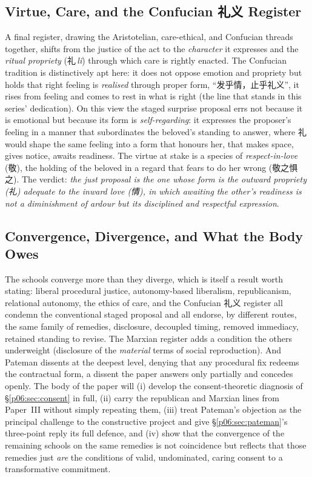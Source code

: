 \subsection{Virtue, Care, and the Confucian \texorpdfstring{\cjkfont 礼义}{liyi} Register}

A final register, drawing the Aristotelian, care-ethical, and Confucian threads together, shifts from the justice of the act to the \emph{character} it expresses and the \emph{ritual propriety} (\cjkfont 礼\,\emph{l\v{i}}) through which care is rightly enacted. The Confucian tradition is distinctively apt here: it does not oppose emotion and propriety but holds that right feeling is \emph{realised} through proper form, ``\cjkfont 发乎情，止乎礼义'', it rises from feeling and comes to rest in what is right (the line that stands in this series' dedication). On this view the staged surprise proposal errs not because it is emotional but because its form is \emph{self-regarding}: it expresses the proposer's feeling in a manner that subordinates the beloved's standing to answer, where \cjkfont 礼 would shape the same feeling into a form that honours her, that makes space, gives notice, awaits readiness. The virtue at stake is a species of \emph{respect-in-love} (\cjkfont 敬), the holding of the beloved in a regard that fears to do her wrong (\cjkfont 敬之惧之). The verdict: \emph{the just proposal is the one whose form is the outward propriety (\cjkfont 礼) adequate to the inward love (\cjkfont 情), in which awaiting the other's readiness is not a diminishment of ardour but its disciplined and respectful expression}.

\subsection{Convergence, Divergence, and What the Body Owes}

The schools converge more than they diverge, which is itself a result worth stating: liberal procedural justice, autonomy-based liberalism, republicanism, relational autonomy, the ethics of care, and the Confucian \cjkfont 礼义 register all condemn the conventional staged proposal and all endorse, by different routes, the same family of remedies, disclosure, decoupled timing, removed immediacy, retained standing to revise. The Marxian register adds a condition the others underweight (disclosure of the \emph{material} terms of social reproduction). And Pateman dissents at the deepest level, denying that any procedural fix redeems the contractual form, a dissent the paper answers only partially and concedes openly. The body of the paper will (i) develop the consent-theoretic diagnosis of §\ref{p06:sec:consent} in full, (ii) carry the republican and Marxian lines from Paper~III without simply repeating them, (iii) treat Pateman's objection as the principal challenge to the constructive project and give §\ref{p06:sec:pateman}'s three-point reply its full defence, and (iv) show that the convergence of the remaining schools on the same remedies is not coincidence but reflects that those remedies just \emph{are} the conditions of valid, undominated, caring consent to a transformative commitment.

